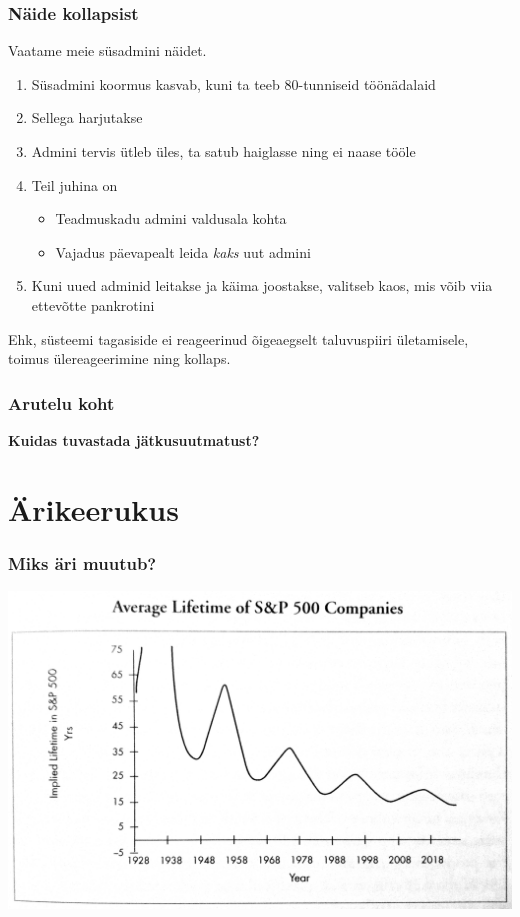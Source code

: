 \begin{frame}[fragile]
  \frametitle{Näide kollapsist}
	Vaatame meie süsadmini näidet. 

	\begin{enumerate}
		\item Süsadmini koormus kasvab, kuni ta teeb 80-tunniseid töönädalaid 
		\item Sellega harjutakse
		\item Admini tervis ütleb üles, ta satub haiglasse ning ei naase tööle
		\item Teil juhina on 
		\begin{itemize}
			\item Teadmuskadu admini valdusala kohta
			\item Vajadus päevapealt leida \emph{kaks} uut admini
		\end{itemize}
		\item Kuni uued adminid leitakse ja käima joostakse, valitseb kaos, mis võib viia ettevõtte pankrotini
	\end{enumerate}
	Ehk, süsteemi tagasiside ei reageerinud õigeaegselt taluvuspiiri ületamisele, toimus ülereageerimine ning kollaps. 
\end{frame}


\begin{frame}[fragile]
  \frametitle{Arutelu koht}
		\begin{center}
			\textbf{Kuidas tuvastada jätkusuutmatust?}
		\end{center}
\end{frame}

\section{Ärikeerukus}
\begin{frame}[fragile]
  \frametitle{Miks äri muutub?}
  	\begin{center}
			\includegraphics[width=.85\textwidth]{sp500.png}
	\end{center}
	\cite{foster2011creative}
\end{frame}

